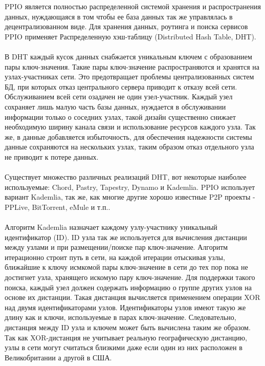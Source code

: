 \documentclass[10pt,a4paper]{article}
\begin{document}
PPIO является полностью распределенной системой хранения и распространения данных, нуждающаяся в том чтобы ее база данных так же управлялась в децентрализованном виде. Для хранения данных, роутинга и поиска сервисов PPIO применяет Распределенную хэш-таблицу (Distributed Hash Table, DHT).\\
\vspace{-0.5em}
\\В DHT каждый кусок данных снабжается уникальным ключем с образованием пары ключ-значения. Такие пары ключ-значение распространяются и хранятся на узлах-участниках сети. Это предотвращает проблемы централизованных систем БД, при которых отказ центрального сервера приводит к отказу всей сети. Обслуживанием всей сети озадачен не один узел-участник. Каждый узел сохраняет лишь малую часть базы данных, нуждается в обслуживании информации только о соседних узлах, такой дизайн существенно снижает необходимую ширину канала связи и использование ресурсов каждого узла. Так же, в данные добавляется избыточность, для обеспечения надежности системы данные сохраняются на нескольких узлах, таким образом отказ отдельного узла не приводит к потере данных.
\vspace{-0.5em}
\\ \\ Существует множество различных реализаций DHT, вот некоторые наиболее используемые: Chord\cite{article14}, Pastry\cite{article15}, Tapestry\cite{article18}, Dynamo\cite{article19} и Kademlia\cite{article16}. PPIO использует вариант Kademlia, так же, как многие другие хорошо известные P2P проекты - PPLive, BitTorrent, eMule и т.п..
 \vspace{-0.5em}
\\ \\Алгоритм Kademlia назначает каждому узлу-участнику уникальный идентификатор (ID). ID узла так же используется для вычисления дистанции между узлами и при размещении/поиске пар ключ-значение. Алгоритм итерационно строит путь в сети, на каждой итерации отыскивая узлы, ближайшие к ключу исмкомой пары ключ-значение в сети до тех пор пока не достигнет узла, хранящего искомую пару ключ-значение. Для поддержки такого поиска, каждый узел должен содержать информацию о группе других узлов на основе их дистанции. Такая дистанция вычисляется применением операции XOR над двумя идентификаторами узлов. Идентификаторы узлов имеют такую же длину как и ключи, используемые в парах ключ-значение. Следовательно, дистанция между ID узла и ключем может быть вычислена таким же образом. Так как XOR-дистанция не учитывает реальную географическую дистанцию, узлы в сети могут считаться близкими даже если один из них расположен в Великобритании а другой в США.
\end{document}
